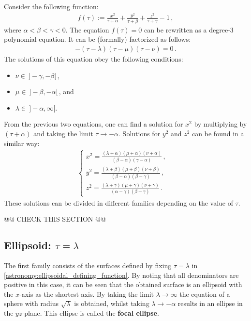     Consider the following function:
    \begin{gather}
        \label{astronomy:ellipsoidal_defining_function}
        f(\tau) := \frac{x^2}{\tau + \alpha} + \frac{y^2}{\tau + \beta} + \frac{z^2}{\tau + \gamma} - 1\,,
    \end{gather}
    where $\alpha<\beta<\gamma<0$. The equation $f(\tau)=0$ can be rewritten as a degree-3 polynomial equation. It can be (formally) factorized as follows:
    \begin{gather}
        -(\tau-\lambda)(\tau-\mu)(\tau-\nu) = 0\,.
    \end{gather}
    The solutions of this equation obey the following conditions:
    \begin{itemize}
        \item $\nu\in\ ]-\gamma,-\beta[$\,,
        \item $\mu\in\ ]-\beta,-\alpha[$\,, and
        \item $\lambda\in\ ]-\alpha,\infty[$.
    \end{itemize}
    From the previous two equations, one can find a solution for $x^2$ by multiplying by $(\tau+\alpha)$ and taking the limit $\tau\rightarrow-\alpha$. Solutions for $y^2$ and $z^2$ can be found in a similar way:
    \begin{gather}
        \label{astronomy:ellipsoidal_coordinates}
        \begin{cases}
            x^2 = \frac{(\lambda + \alpha)(\mu + \alpha)(\nu + \alpha)}{(\beta - \alpha)(\gamma - \alpha)}\,,&\\
            y^2 = \frac{(\lambda + \beta)(\mu + \beta)(\nu + \beta)}{(\beta - \alpha)(\beta - \gamma)}\,,&\\
            z^2 = \frac{(\lambda + \gamma)(\mu + \gamma)(\nu + \gamma)}{(\alpha - \gamma)(\beta - \gamma)}\,.&
        \end{cases}
    \end{gather}
    These solutions can be divided in different families depending on the value of $\tau$.

    @@ CHECK THIS SECTION @@

\subsection{Ellipsoid: \texorpdfstring{$\tau=\lambda$}{tau equals lambda}}

    The first family consists of the surfaces defined by fixing $\tau=\lambda$ in \cref{astronomy:ellipsoidal_defining_function}. By noting that all denominators are positive in this case, it can be seen that the obtained surface is an ellipsoid with the $x$-axis as the shortest axis. By taking the limit $\lambda\longrightarrow\infty$ the equation of a sphere with radius $\sqrt{\lambda}$ is obtained, whilst taking $\lambda\longrightarrow-\alpha$ results in an ellipse in the $yz$-plane. This ellipse is called the \textbf{focal ellipse}.

